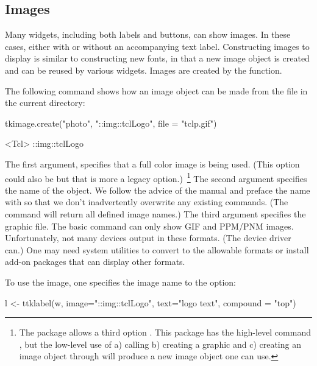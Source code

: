 \subsection{Images}
\label{sec:tcltk:overview:images}


Many  widgets, including both labels and buttons, can show
images. In these cases, either with or without an accompanying text
label. Constructing images to display is similar to constructing new
fonts, in that a new image object is created and can be reused by
various widgets. Images are created by the 
function. 

The following command shows how an image object can be made from the
file  in the current directory:

\begin{Schunk}
\begin{Sinput}
 tkimage.create("photo", "::img::tclLogo", file = "tclp.gif")
\end{Sinput}
\begin{Soutput}
<Tcl> ::img::tclLogo 
\end{Soutput}
\end{Schunk}


The first argument,  specifies that a full color image is
being used. (This option could also be  but that is more
a legacy option.)~\footnote{The  package allows a third
  option . This package has the high-level command
  , but the low-level use of a) calling
   b) creating a graphic and c) creating an image
  object through  will
  produce a new image object one can use.} The second argument
specifies the name of the object. We follow the advice of the \TK\/
manual and preface the name with  so that we don't
inadvertently overwrite any existing \TCL\/ commands. (The command
 will return all defined image names.) The
third argument  specifies the graphic
file. The basic \TK\/  command can only show GIF and
PPM/PNM images. Unfortunately, not many \R\/ devices output in these
formats. (The  device driver can.) One may need system
utilities to convert to the allowable formats or install add-on \TCL\/
packages that can display other formats.~

To use the image, one specifies the image name to the
 option:
\begin{Schunk}
\begin{Sinput}
 l <- ttklabel(w, image="::img::tclLogo", text="logo text", 
               compound = "top")
\end{Sinput}
\end{Schunk}

